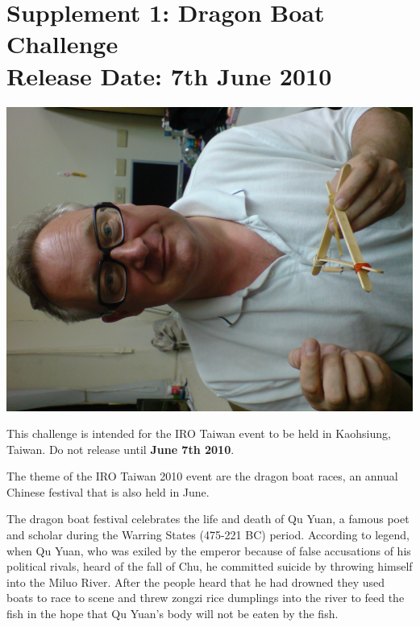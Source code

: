 \documentclass[12pt]{hurocup}
\begin{document}
\newpage

\section{Supplement 1: Dragon Boat Challenge\\Release Date: 7th June 2010}
\label{sec:supp-dragaon-boat-challenge}

\begin{center}
 \includegraphics[width=0.7\linewidth,angle=-90]{Figures/junkyard_challenge_life3}
\end{center}

This challenge is intended for the IRO Taiwan event to be held in
Kaohsiung, Taiwan. Do not release until \textbf{June 7th 2010}.

The theme of the IRO Taiwan 2010 event are the dragon boat races, an
annual Chinese festival that is also held in June.

The dragon boat festival celebrates the life and death of Qu Yuan, a
famous poet and scholar during the Warring States (475-221 BC)
period. According to legend, when Qu Yuan, who was exiled by the
emperor because of false accusations of his political rivals, heard of
the fall of Chu, he committed suicide by throwing himself into the
Miluo River. After the people heard that he had drowned they used
boats to race to scene and threw zongzi rice dumplings into the river
to feed the fish in the hope that Qu Yuan's body will not be eaten by
the fish.

\label{dbc-field}
\end{document}
